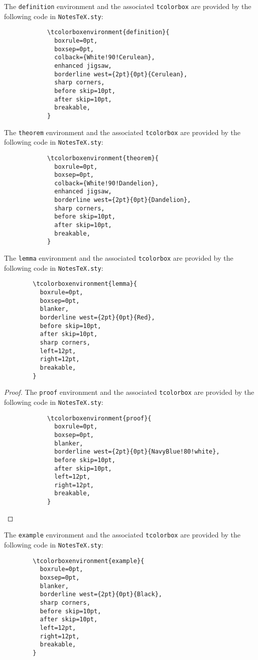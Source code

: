 \documentclass[10pt]{article}
\begin{document}
	\begin{definition}
		The \texttt{definition} environment and the associated \texttt{tcolorbox} are provided by the following code in \texttt{NotesTeX.sty}:
		\begin{verbatim}
			\tcolorboxenvironment{definition}{
			  boxrule=0pt,
			  boxsep=0pt,
			  colback={White!90!Cerulean},
			  enhanced jigsaw, 
			  borderline west={2pt}{0pt}{Cerulean},
			  sharp corners,
			  before skip=10pt,
			  after skip=10pt,
			  breakable,
			}
		\end{verbatim}
	\end{definition}
	\begin{theorem}
		The \texttt{theorem} environment and the associated \texttt{tcolorbox} are provided by the following code in \texttt{NotesTeX.sty}:
		\begin{verbatim}
			\tcolorboxenvironment{theorem}{
			  boxrule=0pt,
			  boxsep=0pt,
			  colback={White!90!Dandelion},
			  enhanced jigsaw, 
			  borderline west={2pt}{0pt}{Dandelion},
			  sharp corners,
			  before skip=10pt,
			  after skip=10pt,
			  breakable,
			}
		\end{verbatim}
	\end{theorem}
	\begin{lemma}
		The \texttt{lemma} environment and the associated \texttt{tcolorbox} are provided by the following code in \texttt{NotesTeX.sty}:
		\begin{verbatim}
		\tcolorboxenvironment{lemma}{
		  boxrule=0pt,
		  boxsep=0pt,
		  blanker,
		  borderline west={2pt}{0pt}{Red},
		  before skip=10pt,
		  after skip=10pt,
		  sharp corners,
		  left=12pt,
		  right=12pt,
		  breakable,
		}
		\end{verbatim}
	\end{lemma}
	\begin{proof}
		The \texttt{proof} environment and the associated \texttt{tcolorbox} are provided by the following code in \texttt{NotesTeX.sty}:
		\begin{verbatim}
			\tcolorboxenvironment{proof}{
			  boxrule=0pt,
			  boxsep=0pt,
			  blanker,
			  borderline west={2pt}{0pt}{NavyBlue!80!white},
			  before skip=10pt,
			  after skip=10pt,
			  left=12pt,
			  right=12pt,
			  breakable,
			}
		\end{verbatim}
	\end{proof}
	\begin{example}
		The \texttt{example} environment and the associated \texttt{tcolorbox} are provided by the following code in \texttt{NotesTeX.sty}:
		\begin{verbatim}	
		\tcolorboxenvironment{example}{
		  boxrule=0pt,
		  boxsep=0pt,
		  blanker,
		  borderline west={2pt}{0pt}{Black},
		  sharp corners,
		  before skip=10pt,
		  after skip=10pt,
		  left=12pt,
		  right=12pt,
		  breakable,
		}
		\end{verbatim}
	\end{example}	
\end{document}
